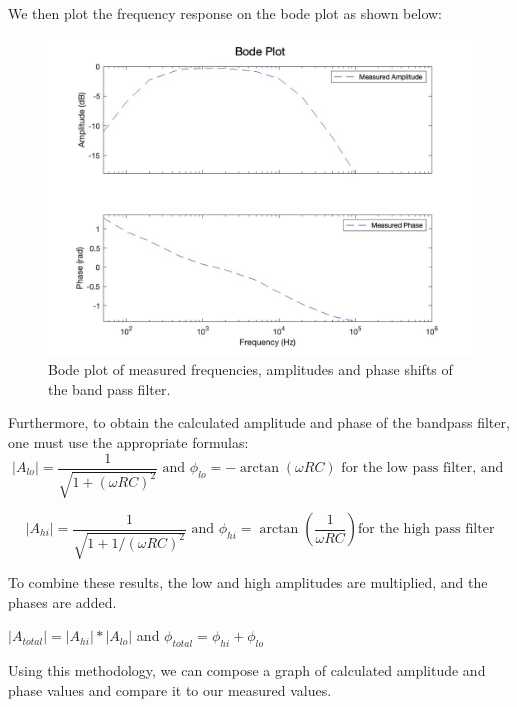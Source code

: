 \pagebreak
We then plot the frequency response on the bode plot as shown below:

\begin{figure}[H]
    \centering
    \includegraphics[scale=0.3]{images/bode_plot_bandpass_measured.jpg}
    \caption{Bode plot of measured frequencies, amplitudes and phase shifts of the band pass filter.}
\end{figure}

Furthermore, to obtain the calculated amplitude and phase of the bandpass filter, one must use the appropriate formulas:
\[
    |A_{lo}| = \frac{1}{\sqrt{1+(\omega RC)^2}} \text{ and } \phi_{lo}=-\arctan(\omega RC) \text{ for the low pass filter, and }
\]


\[
    |A_{hi}| = \frac{1}{\sqrt{1+1/(\omega RC)^2}} \text{ and } \phi_{hi}=\arctan\left(\frac{1}{\omega RC}\right) \text{for the high pass filter}
\]


To combine these results, the low and high amplitudes are multiplied, and the phases are added.


\(|A_{total}| = |A_{hi}| * |A_{lo}|\) and \(\phi_{total} = \phi_{hi} + \phi_{lo}\)

Using this methodology, we can compose a graph of calculated amplitude and phase values and compare it to our measured values.

